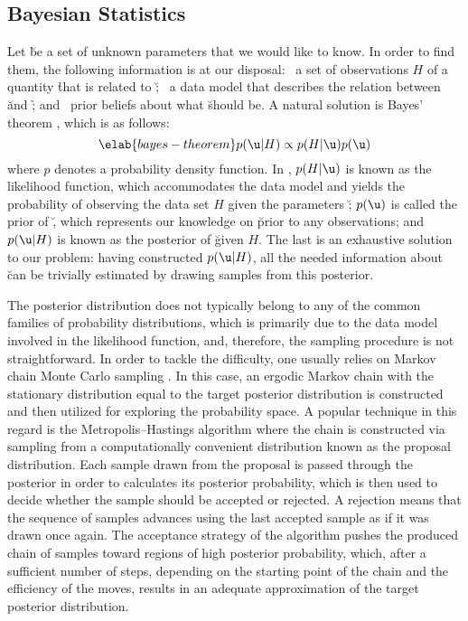 \subsection{Bayesian Statistics}

Let \u be a set of unknown parameters that we would like to know. In order to
find them, the following information is at our disposal: \one~a set of
observations $H$ of a quantity \h that is related to \u; \two~a data model that
describes the relation between \u and \h; and \three~prior beliefs about what \u
should be. A natural solution is Bayes' theorem \cite{gelman2004}, which is as
follows:
\begin{equation} \elab{bayes-theorem}
  p(\u | H) \propto p(H | \u) p(\u)
\end{equation}
where $p$ denotes a probability density function. In , $p(H
| \u)$ is known as the likelihood function, which accommodates the data model
and yields the probability of observing the data set $H$ given the parameters
\u; $p(\u)$ is called the prior of \u, which represents our knowledge on \u
prior to any observations; and $p(\u | H)$ is known as the posterior of \u given
$H$. The last is an exhaustive solution to our problem: having constructed $p(\u
| H)$, all the needed information about \u can be trivially estimated by drawing
samples from this posterior.

The posterior distribution does not typically belong to any of the common
families of probability distributions, which is primarily due to the data model
involved in the likelihood function, and, therefore, the sampling procedure is
not straightforward. In order to tackle the difficulty, one usually relies on
Markov chain Monte Carlo sampling \cite{gelman2004}. In this case, an ergodic
Markov chain with the stationary distribution equal to the target posterior
distribution is constructed and then utilized for exploring the probability
space. A popular technique in this regard is the Metropolis--Hastings algorithm
where the chain is constructed via sampling from a computationally convenient
distribution known as the proposal distribution. Each sample drawn from the
proposal is passed through the posterior in order to calculates its posterior
probability, which is then used to decide whether the sample should be accepted
or rejected. A rejection means that the sequence of samples advances using the
last accepted sample as if it was drawn once again. The acceptance strategy of
the algorithm pushes the produced chain of samples toward regions of high
posterior probability, which, after a sufficient number of steps, depending on
the starting point of the chain and the efficiency of the moves, results in an
adequate approximation of the target posterior distribution.
